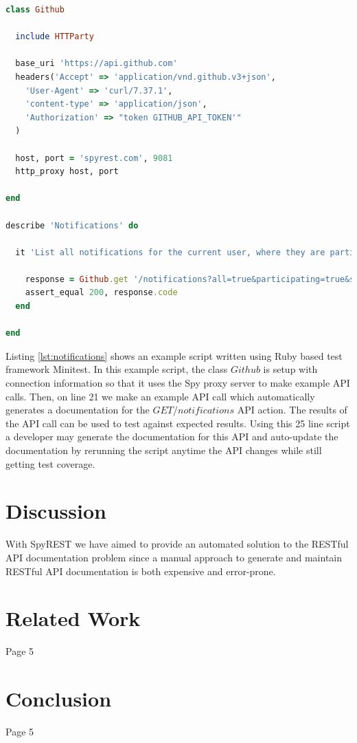 \documentclass[conference]{IEEEtran}
\begin{document}
\begin{lstlisting}[language=ruby, breaklines=true, caption={}, label=list:ex, float,floatplacement=H, caption=Example API call using SpyREST, label={lst:notifications}]
class Github

  include HTTParty

  base_uri 'https://api.github.com'
  headers('Accept' => 'application/vnd.github.v3+json',
    'User-Agent' => 'curl/7.37.1',
    'content-type' => 'application/json',
    'Authorization' => "token GITHUB_API_TOKEN'"
  )

  host, port = 'spyrest.com', 9081
  http_proxy host, port

end

describe 'Notifications' do

  it 'List all notifications for the current user, where they are participating, since a time' do

    response = Github.get '/notifications?all=true&participating=true&since=2014-01-01T00:00:00Z'
    assert_equal 200, response.code
  end

end\end{lstlisting}

Listing \ref{lst:notifications} shows an example script written using Ruby based test framework Minitest. In this example script, the class $Github$ is setup with connection information so that it uses the Spy proxy server to make example API calls. Then, on line 21 we make an example API call which automatically generates a documentation for the $GET /notifications$ API action. The results of the API call can be used to test against expected results. Using this 25 line script a developer may generate the documentation for this API and auto-update the documentation by rerunning the script anytime the API changes while still getting test coverage.

\section{Discussion}
With SpyREST we have aimed to provide an automated solution to the RESTful API documentation problem since a manual approach to generate and maintain RESTful API documentation is both expensive and error-prone.


\section{Related Work}
Page 5

\section{Conclusion}
Page 5
\end{document}
